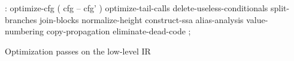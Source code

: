 \centering

  \begin{factorcode}
    : optimize-cfg ( cfg -- cfg' )
        optimize-tail-calls
        delete-useless-conditionals
        split-branches
        join-blocks
        normalize-height
        construct-ssa
        alias-analysis
        value-numbering
        copy-propagation
        eliminate-dead-code ;
  \end{factorcode}

\caption{Optimization passes on the low-level IR}
